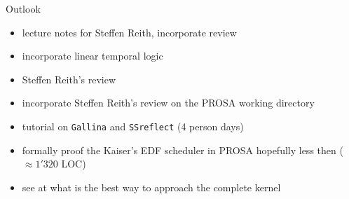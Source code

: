 \documentclass{beamer}
\begin{document}
	\begin{frame}{Outlook}
		 \begin{itemize}
		 	 \item lecture notes for Steffen Reith, incorporate  review
		 	 \item incorporate linear temporal logic
			  \item Steffen Reith's review 
			  \item incorporate Steffen Reith's review on the PROSA working directory
		      \item tutorial on \texttt{Gallina} and \texttt{SSreflect} (4 person days)
			   \item formally proof the Kaiser's EDF scheduler in PROSA hopefully less then ($\approx 1'320$ LOC)
			  \item see at what is the best way to approach the complete kernel
	           
		  \end{itemize}
    	
	\end{frame}

	
	
	
	
	
	
	
	
	
	
	
\end{document}
